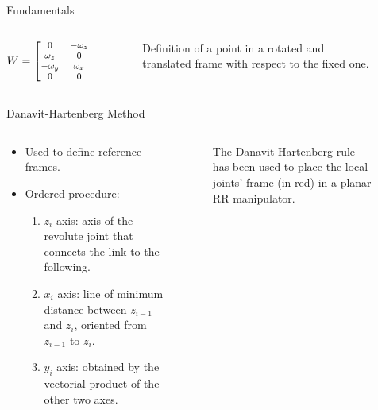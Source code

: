 \begin{frame}{Fundamentals}
\begin{columns}
\begin{column}{0.5\textwidth}
\begin{itemize}
\begin{equation}
                    \begin{footnotesize}
                    W=\begin{bmatrix}
                      0&-\omega_z&\omega_y&v_x\\
                      \omega_z&0&-\omega_x&v_y\\
                      -\omega_y&\omega_x&0&v_z\\
                      0&0&0&0
                    \end{bmatrix}
                    \end{footnotesize}
                  \end{equation}
            \end{itemize}
        \end{column}
        \begin{column}{0.5\textwidth}
            \begin{figure}
                \centering
                \scalebox{0.6}{}
                \caption{Definition of a point in a rotated and translated frame with respect to the fixed one.}
              \end{figure}
        \end{column}
    \end{columns}
\end{frame}

\begin{frame}{Danavit-Hartenberg Method}
    \begin{columns}
        \begin{column}{0.5\textwidth}
            \begin{itemize}
                \item Used to define reference frames.
                \item Ordered procedure:
                    \begin{enumerate}
                        \item $z_i$ axis: axis of the revolute joint that connects the link to the following.
                        \item $x_i$ axis: line of minimum distance between $z_{i-1}$ and $z_i$, oriented from $z_{i-1}$ to $z_i$.
                        \item $y_i$ axis: obtained by the vectorial product of the other two axes.
                    \end{enumerate}
            \end{itemize}
        \end{column}
        \begin{column}{0.5\textwidth}
            \begin{figure}
                \centering
                \scalebox{0.4}{}
                \caption{The Danavit-Hartenberg rule has been used to place the local joints' frame (in red) in a planar RR manipulator.}
              \end{figure}
        \end{column}
    \end{columns}
\end{frame}

